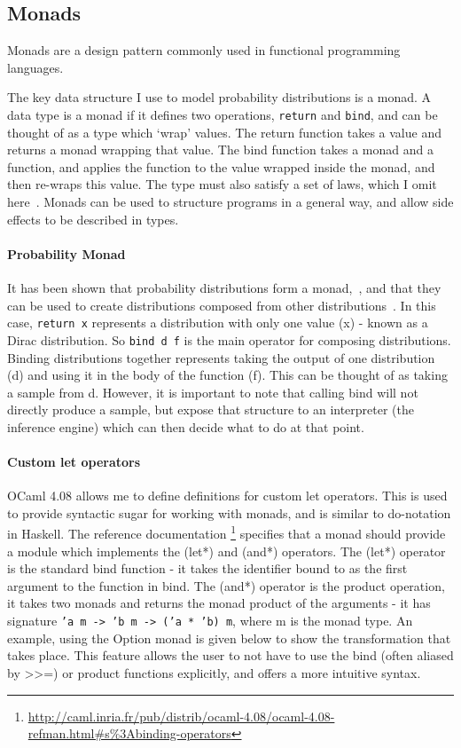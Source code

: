 \documentclass[sigconf]{acmart}
\begin{document}
\subsection{Monads}
Monads are a design pattern commonly used in functional programming languages.

The key data structure I use to model probability distributions is a monad. A data type is a monad if it defines two operations, \texttt{return} and \texttt{bind}, and can be thought of as a type which `wrap' values. The return function takes a value and returns a monad wrapping that value. The bind function takes a monad and a function, and applies the function to the value wrapped inside the monad, and then re-wraps this value. The type must also satisfy a set of laws, which I omit here~\cite{wadler1990comprehending}. Monads can be used to structure programs in a general way, and allow side effects to be described in types.

\paragraph{Probability Monad} \label{sec:prep-monad}
It has been shown that probability distributions form a monad,~\cite{giry1982categorical, jones1989probabilistic}, and that they can be used to create distributions composed from other distributions~\cite{ramsey2002stochastic}. In this case, \texttt{return x} represents a distribution with only one value (x) - known as a Dirac distribution. So \texttt{bind d f} is the main operator for composing distributions. Binding distributions together represents taking the output of one distribution (d) and using it in the body of the function (f). This can be thought of as taking a sample from d. However, it is important to note that calling bind will not directly produce a sample, but expose that structure to an interpreter (the inference engine) which can then decide what to do at that point.

\paragraph{Custom let operators}
OCaml 4.08 allows me to define definitions for custom let operators. This is used to provide syntactic sugar for working with monads, and is similar to do-notation in Haskell. The reference documentation \footnote{\url{http://caml.inria.fr/pub/distrib/ocaml-4.08/ocaml-4.08-refman.html\#s\%3Abinding-operators}} specifies that a monad should provide a module which implements the (let*) and (and*) operators. The (let*) operator is the standard bind function - it takes the identifier bound to as the first argument to the function in bind. The (and*) operator is the product operation, it takes two monads and returns the monad product of the arguments - it has signature \texttt{'a m -> 'b m -> ('a * 'b) m}, where m is the monad type. An example, using the Option monad is given below to show the transformation that takes place. This feature allows the user to not have to use the bind (often aliased by >>=) or product functions explicitly, and offers a more intuitive syntax.
\end{document}
